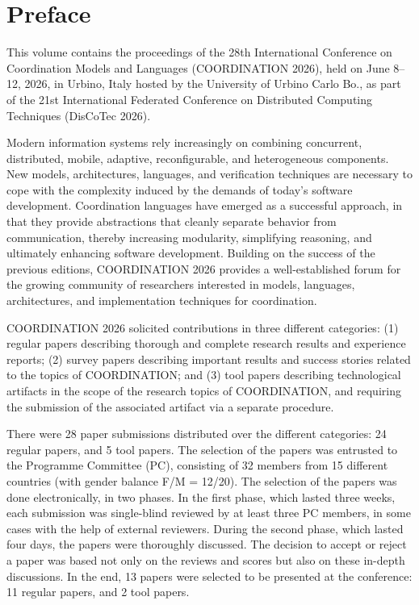 \documentclass[runningheads]{llncs}
\begin{document}
\frontmatter
\setcounter{page}{5}

\chapter*{Preface}
This volume contains the proceedings of the 28th International Conference on Coordination Models and Languages (COORDINATION 2026), held on June 8–12, 2026, in Urbino, Italy hosted by the
University of Urbino Carlo Bo., as part of the 21st International Federated
Conference on Distributed Computing Techniques (DisCoTec 2026).


Modern information systems rely increasingly on combining concurrent, distributed,
mobile, adaptive, reconfigurable, and heterogeneous components. New models, architectures, languages, and verification techniques are necessary to cope with the complexity induced by the demands of today’s software development. Coordination languages
have emerged as a successful approach, in that they provide abstractions that cleanly
separate behavior from communication, thereby increasing modularity, simplifying
reasoning, and ultimately enhancing software development. Building on the success of
the previous editions, COORDINATION 2026 provides a well-established forum for the
growing community of researchers interested in models, languages, architectures, and
implementation techniques for coordination.


COORDINATION 2026 solicited contributions in three different categories: (1) regular papers describing thorough and complete research results and experience reports;
(2) survey papers describing important results and success stories related to
the topics of COORDINATION; and (3) tool papers describing technological artifacts
in the scope of the research topics of COORDINATION, and requiring the submission
of the associated artifact via a separate procedure.


There were 28 paper submissions distributed over the different categories: 24 regular
papers, and 5 tool papers. The selection of the papers
was entrusted to the Programme Committee (PC), consisting of 32 members from 15
different countries (with gender balance F/M = 12/20). The selection of the papers was
done electronically, in two phases. In the first phase, which lasted three weeks, each
submission was single-blind reviewed by at least three PC members, in some cases with
the help of external reviewers. During the second phase, which lasted four days, the papers were thoroughly discussed. The decision to accept or reject a paper
was based not only on the reviews and scores but also on these in-depth discussions. In
the end, 13 papers were selected to be presented at the conference: 11 regular papers, and 2 tool papers. 
\end{document}
